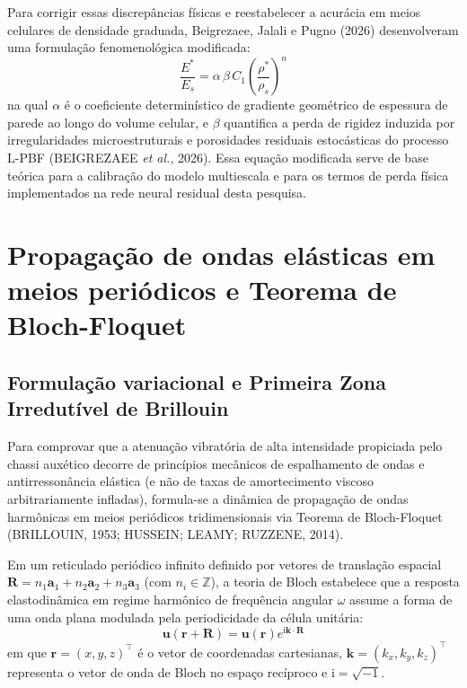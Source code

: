 Para corrigir essas discrepâncias físicas e reestabelecer a acurácia em meios celulares de densidade graduada, Beigrezaee, Jalali e Pugno (2026) desenvolveram uma formulação fenomenológica modificada:
\begin{equation}
  \frac{E^{*}}{E_s} = \alpha\,\beta\,C_1 \left( \frac{\rho^{*}}{\rho_s} \right)^{n}
  \label{eq:gibson-refinado-teoria}
\end{equation}
na qual $\alpha$ é o coeficiente determinístico de gradiente geométrico de espessura de parede ao longo do volume celular, e $\beta$ quantifica a perda de rigidez induzida por irregularidades microestruturais e porosidades residuais estocásticas do processo L-PBF (BEIGREZAEE \textit{et al.}, 2026). Essa equação modificada serve de base teórica para a calibração do modelo multiescala e para os termos de perda física implementados na rede neural residual desta pesquisa.

\section{Propagação de ondas elásticas em meios periódicos e Teorema de Bloch-Floquet}
\label{sec:bloch-teoria}

\subsection{Formulação variacional e Primeira Zona Irredutível de Brillouin}
\label{subsec:bloch-variacional}

Para comprovar que a atenuação vibratória de alta intensidade propiciada pelo chassi auxético decorre de princípios mecânicos de espalhamento de ondas e antirressonância elástica (e não de taxas de amortecimento viscoso arbitrariamente infladas), formula-se a dinâmica de propagação de ondas harmônicas em meios periódicos tridimensionais via Teorema de Bloch-Floquet (BRILLOUIN, 1953; HUSSEIN; LEAMY; RUZZENE, 2014).

Em um reticulado periódico infinito definido por vetores de translação espacial $\mathbf{R} = n_1 \mathbf{a}_1 + n_2 \mathbf{a}_2 + n_3 \mathbf{a}_3$ (com $n_i \in \mathbb{Z}$), a teoria de Bloch estabelece que a resposta elastodinâmica em regime harmônico de frequência angular $\omega$ assume a forma de uma onda plana modulada pela periodicidade da célula unitária:
\begin{equation}
  \mathbf{u}(\mathbf{r} + \mathbf{R}) = \mathbf{u}(\mathbf{r}) e^{\mathrm{i} \mathbf{k} \cdot \mathbf{R}}
  \label{eq:bloch-teoria-geral}
\end{equation}
em que $\mathbf{r} = (x, y, z)^\top$ é o vetor de coordenadas cartesianas, $\mathbf{k} = (k_x, k_y, k_z)^\top$ representa o vetor de onda de Bloch no espaço recíproco e $\mathrm{i} = \sqrt{-1}$.

